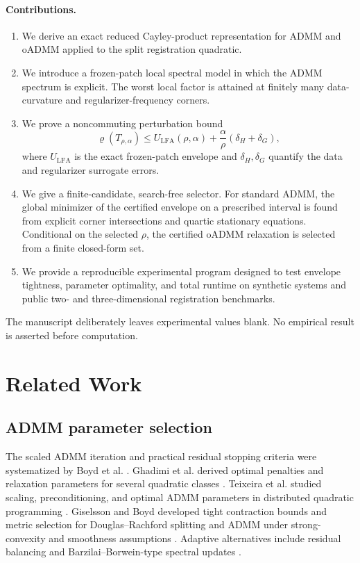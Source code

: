 \documentclass[11pt]{article}
\theoremstyle{definition}
\newcommand{\spr}{\varrho}
\begin{document}
\paragraph{Contributions.}
\begin{enumerate}[leftmargin=2em]
\item We derive an exact reduced Cayley-product representation for ADMM and oADMM applied to the split registration quadratic.
\item We introduce a frozen-patch local spectral model in which the ADMM spectrum is explicit. The worst local factor is attained at finitely many data-curvature and regularizer-frequency corners.
\item We prove a noncommuting perturbation bound
\[
\spr(T_{\rho,\alpha})
\le U_{\mathrm{LFA}}(\rho,\alpha)
+\frac{\alpha}{\rho}(\delta_H+\delta_G),
\]
where $U_{\mathrm{LFA}}$ is the exact frozen-patch envelope and $\delta_H,\delta_G$ quantify the data and regularizer surrogate errors.
\item We give a finite-candidate, search-free selector. For standard ADMM, the global minimizer of the certified envelope on a prescribed interval is found from explicit corner intersections and quartic stationary equations. Conditional on the selected $\rho$, the certified oADMM relaxation is selected from a finite closed-form set.
\item We provide a reproducible experimental program designed to test envelope tightness, parameter optimality, and total runtime on synthetic systems and public two- and three-dimensional registration benchmarks.
\end{enumerate}

The manuscript deliberately leaves experimental values blank. No empirical result is asserted before computation.

\section{Related Work}
\subsection{ADMM parameter selection}
The scaled ADMM iteration and practical residual stopping criteria were systematized by Boyd et al. \cite{Boyd2011}. Ghadimi et al. derived optimal penalties and relaxation parameters for several quadratic classes \cite{Ghadimi2015}. Teixeira et al. studied scaling, preconditioning, and optimal ADMM parameters in distributed quadratic programming \cite{Teixeira2016}. Giselsson and Boyd developed tight contraction bounds and metric selection for Douglas--Rachford splitting and ADMM under strong-convexity and smoothness assumptions \cite{GiselssonBoyd2017}. Adaptive alternatives include residual balancing and Barzilai--Borwein-type spectral updates \cite{Wohlberg2017,Xu2017}.
\end{document}

